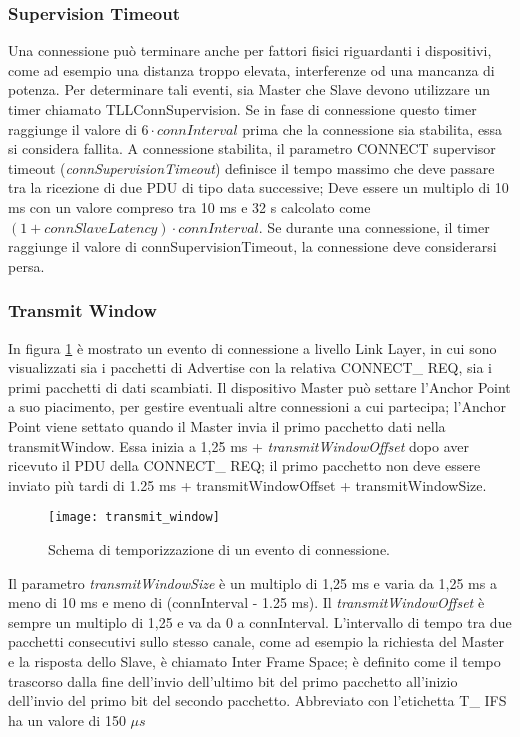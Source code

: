 \subsubsection{Supervision Timeout}\label{timeout}
Una connessione può terminare anche per fattori fisici riguardanti i dispositivi, come ad esempio una distanza troppo elevata, interferenze od una mancanza di potenza. Per determinare tali eventi, sia Master che Slave devono utilizzare un timer chiamato TLLConnSupervision. 
Se in fase di connessione questo timer raggiunge il valore di $6 \cdot connInterval$ prima che la connessione sia stabilita, essa si considera fallita.
A connessione stabilita, il parametro CONNECT supervisor timeout (\emph{connSupervisionTimeout}) definisce il tempo massimo che deve passare tra la ricezione di due PDU di tipo data successive; Deve essere un multiplo di 10 ms con un valore compreso tra 10 ms e 32 s calcolato come $(1 + connSlaveLatency) \cdot connInterval$.
Se durante una connessione, il timer raggiunge il valore di connSupervisionTimeout, la connessione deve considerarsi persa.

\subsubsection{Transmit Window}
In figura \ref{transmit_window} è mostrato un evento di connessione a livello Link Layer, in cui sono visualizzati sia i pacchetti di Advertise con la relativa CONNECT\_ REQ, sia i primi pacchetti di dati scambiati. Il dispositivo Master può settare l'Anchor Point a suo piacimento, per gestire eventuali altre connessioni a cui partecipa; l'Anchor Point viene settato quando il Master invia il primo pacchetto dati nella transmitWindow. Essa inizia a 1,25 ms + \emph{transmitWindowOffset} dopo aver ricevuto il PDU della CONNECT\_ REQ; il primo pacchetto non deve essere inviato più tardi di 1.25 ms + transmitWindowOffset + transmitWindowSize.

\begin{figure}[H]
\texttt{[image: transmit\_window]}
\centering
\caption{Schema di temporizzazione di un evento di connessione. }
\label{transmit_window}
\end{figure}

Il parametro \emph{transmitWindowSize} è un multiplo di 1,25 ms e varia da 1,25 ms a meno di 10 ms e meno di (connInterval - 1.25 ms). Il \emph{transmitWindowOffset} è sempre un multiplo di 1,25 e va da 0 a connInterval.
L'intervallo di tempo tra due pacchetti consecutivi sullo stesso canale, come ad esempio la richiesta del Master e la risposta dello Slave, è chiamato Inter Frame Space; è definito come il tempo trascorso dalla fine dell'invio dell'ultimo bit del primo pacchetto all'inizio dell'invio del primo bit del secondo pacchetto. Abbreviato con l'etichetta T\_ IFS ha un valore di 150 $\mu s$


